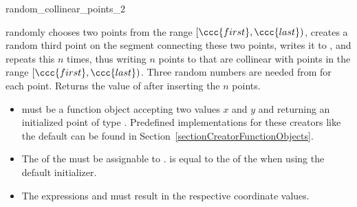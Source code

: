 \begin{ccRefFunction}{random_collinear_points_2}

\ccDefinition


\def\ccLongParamLayout{\ccTrue}
{ randomly chooses two points from the range $[\ccc{first},\ccc{last})$,
    creates a random third point on the segment connecting these two
    points, writes it to , and repeats this $n$ times, thus
    writing $n$ points to  that are collinear with points
    in the range $[\ccc{first},\ccc{last})$.
    Three random numbers are needed from  for each point.
    Returns the value of  after inserting the $n$ points.
}
\def\ccLongParamLayout{\ccFalse}

\ccRequirements
\begin{itemize}
  \item  {} must be a function object accepting two
          values $x$ and $y$ and returning an initialized point
          of type . Predefined implementations for these
         creators like the default can be found in
         Section~\ref{sectionCreatorFunctionObjects}. 
  \item The  of the  must be 
        assignable to .   is equal to the  of the
         when using the default initializer.
  \item The expressions  and
         must result in the respective
        coordinate values.
\end{itemize}

\ccSeeAlso

 \\
 \\
 \\
 \\
 \\

\end{ccRefFunction}
